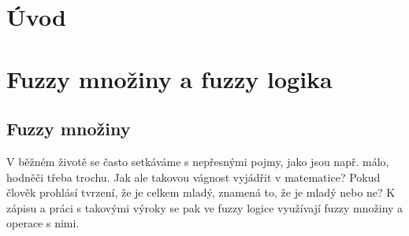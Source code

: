 


\newtheorem{definition}{Definice}
\newtheorem{remark}{Pozn\'amka}
\newtheorem{example}{Příklad}
\newtheorem{graph}{Obr\' azek}
\newtheorem{sentence}{Věta}
\newtheorem{tabul}{Tabulka}
\newtheorem{corollary}{D\r usledek}
\newcommand{\mycomment}[1]{}

\chapter{Úvod}





\chapter {Fuzzy mno\v ziny a fuzzy logika}
\section{Fuzzy mno\v ziny} 


V běžném životě se často setkáváme s nepřesnými pojmy, jako jsou např. \clqq málo\crqq, \clqq hodně\crqq \space či třeba \clqq trochu\crqq. Jak ale takovou vágnost vyjádřit v matematice? Pokud člověk prohlásí tvrzení, že je \clqq celkem mladý\crqq, znamená to, že je mladý nebo ne? K zápisu a práci s takovými výroky se pak ve fuzzy logice využívají fuzzy množiny a operace s nimi.

